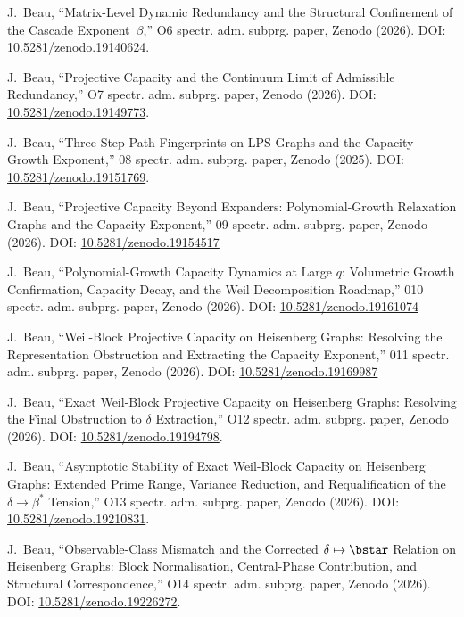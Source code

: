 J.~Beau,
``Matrix-Level Dynamic Redundancy and the Structural Confinement of the Cascade Exponent~$\beta$,''
O6 spectr. adm. subprg. paper, Zenodo (2026).
DOI: \href{https://doi.org/10.5281/zenodo.19140624}{10.5281/zenodo.19140624}.

J.~Beau,
``Projective Capacity and the Continuum Limit of Admissible Redundancy,''
O7 spectr. adm. subprg. paper, Zenodo (2026).
DOI: \href{https://doi.org/10.5281/zenodo.19149773}{10.5281/zenodo.19149773}.

J.~Beau,
``Three-Step Path Fingerprints on LPS Graphs and the Capacity Growth Exponent,''
08 spectr. adm. subprg. paper, Zenodo (2025).
DOI: \href{https://doi.org/10.5281/zenodo.19151769}{10.5281/zenodo.19151769}.

J.~Beau,
``Projective Capacity Beyond Expanders: Polynomial-Growth Relaxation Graphs and the Capacity Exponent,''
09 spectr. adm. subprg. paper, Zenodo (2026).
DOI: \href{https://doi.org/10.5281/zenodo.19154517}{10.5281/zenodo.19154517}

J.~Beau,
``Polynomial-Growth Capacity Dynamics at Large $q$: Volumetric Growth Confirmation, Capacity Decay, and the Weil
Decomposition Roadmap,''
010 spectr. adm. subprg. paper, Zenodo (2026).
DOI: \href{https://doi.org/10.5281/zenodo.19161074}{10.5281/zenodo.19161074}

J.~Beau,
``Weil-Block Projective Capacity on Heisenberg Graphs: Resolving the Representation Obstruction and Extracting the
Capacity Exponent,''
011 spectr. adm. subprg. paper, Zenodo (2026).
DOI: \href{https://doi.org/10.5281/zenodo.19169987}{10.5281/zenodo.19169987}

J.~Beau,
``Exact Weil-Block Projective Capacity on Heisenberg Graphs: Resolving the Final Obstruction to $\delta$ Extraction,''
O12 spectr. adm. subprg. paper, Zenodo (2026).
DOI: \href{https://doi.org/10.5281/zenodo.19194798}{10.5281/zenodo.19194798}.

J.~Beau,
``Asymptotic Stability of Exact Weil-Block Capacity on Heisenberg Graphs: Extended Prime Range, Variance Reduction,
and Requalification of the \(\delta \to \beta^*\) Tension,''
O13 spectr. adm. subprg. paper, Zenodo (2026).
DOI: \href{https://doi.org/10.5281/zenodo.19210831}{10.5281/zenodo.19210831}.

J.~Beau,
``Observable-Class Mismatch and the Corrected $\delta \mapsto \bstar$ Relation on Heisenberg Graphs:
Block Normalisation, Central-Phase Contribution,
and Structural Correspondence,''
O14 spectr. adm. subprg. paper, Zenodo (2026).
DOI: \href{https://doi.org/10.5281/zenodo.19226272}{10.5281/zenodo.19226272}.

